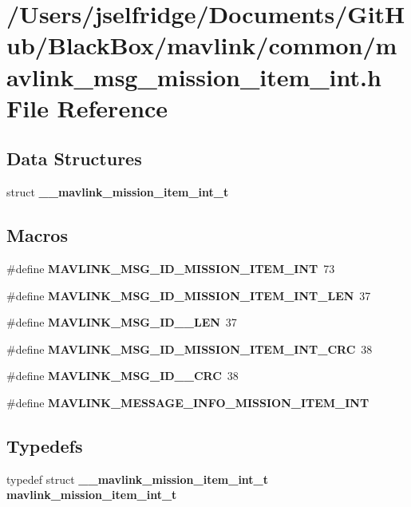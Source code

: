 \section{/\+Users/jselfridge/\+Documents/\+Git\+Hub/\+Black\+Box/mavlink/common/mavlink\+\_\+msg\+\_\+mission\+\_\+item\+\_\+int.h File Reference}
\label{mavlink__msg__mission__item__int_8h}
\subsection*{Data Structures}
\begin{DoxyCompactItemize}
\item 
struct \textbf{ \+\_\+\+\_\+mavlink\+\_\+mission\+\_\+item\+\_\+int\+\_\+t}
\end{DoxyCompactItemize}
\subsection*{Macros}
\begin{DoxyCompactItemize}
\item 
\#define \textbf{ M\+A\+V\+L\+I\+N\+K\+\_\+\+M\+S\+G\+\_\+\+I\+D\+\_\+\+M\+I\+S\+S\+I\+O\+N\+\_\+\+I\+T\+E\+M\+\_\+\+I\+NT}~73
\item 
\#define \textbf{ M\+A\+V\+L\+I\+N\+K\+\_\+\+M\+S\+G\+\_\+\+I\+D\+\_\+\+M\+I\+S\+S\+I\+O\+N\+\_\+\+I\+T\+E\+M\+\_\+\+I\+N\+T\+\_\+\+L\+EN}~37
\item 
\#define \textbf{ M\+A\+V\+L\+I\+N\+K\+\_\+\+M\+S\+G\+\_\+\+I\+D\+\_\+\_\+\+L\+EN}~37
\item 
\#define \textbf{ M\+A\+V\+L\+I\+N\+K\+\_\+\+M\+S\+G\+\_\+\+I\+D\+\_\+\+M\+I\+S\+S\+I\+O\+N\+\_\+\+I\+T\+E\+M\+\_\+\+I\+N\+T\+\_\+\+C\+RC}~38
\item 
\#define \textbf{ M\+A\+V\+L\+I\+N\+K\+\_\+\+M\+S\+G\+\_\+\+I\+D\+\_\+\_\+\+C\+RC}~38
\item 
\#define \textbf{ M\+A\+V\+L\+I\+N\+K\+\_\+\+M\+E\+S\+S\+A\+G\+E\+\_\+\+I\+N\+F\+O\+\_\+\+M\+I\+S\+S\+I\+O\+N\+\_\+\+I\+T\+E\+M\+\_\+\+I\+NT}
\end{DoxyCompactItemize}
\subsection*{Typedefs}
\begin{DoxyCompactItemize}
\item 
typedef struct \textbf{ \+\_\+\+\_\+mavlink\+\_\+mission\+\_\+item\+\_\+int\+\_\+t} \textbf{ mavlink\+\_\+mission\+\_\+item\+\_\+int\+\_\+t}
\end{DoxyCompactItemize}


